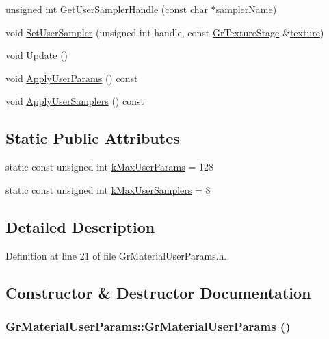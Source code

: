 \begin{CompactItemize}
\item 
unsigned int \hyperlink{class_gr_material_user_params_a4e2483fc93c735416c8cfa9f0a7bca7}{GetUserSamplerHandle} (const char $\ast$samplerName)
\item 
void \hyperlink{class_gr_material_user_params_a661de3e2b9b34e6a8713be6f64d899a}{SetUserSampler} (unsigned int handle, const \hyperlink{class_gr_texture_stage}{GrTextureStage} \&\hyperlink{glext__bak_8h_8f486379aef534669f4f06f515e7ce6c}{texture})
\item 
void \hyperlink{class_gr_material_user_params_fd456a4ffa7efb1616507100d66e0306}{Update} ()
\item 
void \hyperlink{class_gr_material_user_params_8b3930f139352c856d7ed694a3c05de6}{ApplyUserParams} () const 
\item 
void \hyperlink{class_gr_material_user_params_6aabd7e3eda8be6d4b764d8f4a4a2ce2}{ApplyUserSamplers} () const 
\end{CompactItemize}
\subsection*{Static Public Attributes}
\begin{CompactItemize}
\item 
static const unsigned int \hyperlink{class_gr_material_user_params_ff25d4f01e95a3645d6e0104d37d72de}{kMaxUserParams} = 128
\item 
static const unsigned int \hyperlink{class_gr_material_user_params_7f9d77d332f6feaa280819c24cb70daf}{kMaxUserSamplers} = 8
\end{CompactItemize}


\subsection{Detailed Description}


Definition at line 21 of file GrMaterialUserParams.h.

\subsection{Constructor \& Destructor Documentation}
\hypertarget{class_gr_material_user_params_421c9f580f17a695f2c576b1639f5036}{
\subsubsection[{GrMaterialUserParams}]{\setlength{\rightskip}{0pt plus 5cm}GrMaterialUserParams::GrMaterialUserParams ()}}
\label{class_gr_material_user_params_421c9f580f17a695f2c576b1639f5036}




